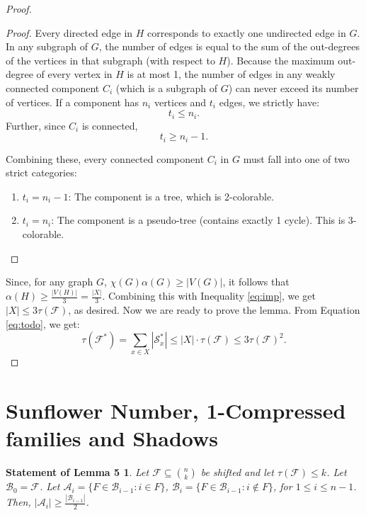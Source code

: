 \documentclass[runningheads,12pt,a4paper]{article}
\newtheorem*{statement5}{Statement of Lemma 5}
\begin{document}
\begin{proof}
\begin{proof}
			Every directed edge in $H$ corresponds to exactly one undirected edge in $G$. In any subgraph of $G$, the number of edges is equal to the sum of the out-degrees of the vertices in that subgraph (with respect to $H$). Because the maximum out-degree of every vertex in $H$ is at most 1, the number of edges in any weakly connected component $C_i$ (which is a subgraph of $G$) can never exceed its number of vertices. If a component has $n_i$ vertices and $t_i$ edges, we strictly have:$$t_i \le n_i.$$
			Further, since $C_i$ is connected, $$t_i \ge n_i-1.$$
			
			Combining these, every connected component $C_i$ in $G$ must fall into one of two strict categories:
			\begin{enumerate}
				\item $t_i = n_i - 1$: The component is a tree, which is 2-colorable. 
				\item $t_i = n_i$: The component is a pseudo-tree (contains exactly 1 cycle). This is $3$-colorable.
			\end{enumerate}
		\end{proof}
		
		Since, for any graph $G$, $\chi(G)\alpha(G) \geq |V(G)|$,
		it follows that $\alpha(H) \geq \frac{|V(H)|}{3}=\frac{|X|}{3}$. Combining this with Inequality \ref{eq:imp}, we get $|X| \leq 3\tau(\mathcal{F})$, as desired.
		Now we are ready to prove the lemma. 
		From Equation \ref{eq:todo}, we get:
		$$\tau(\mathcal{F}^*) = \sum_{x \in X}|\mathcal{S}^*_x| \leq |X| \cdot \tau(\mathcal{F}) \leq 3\tau(\mathcal{F})^2.$$
	\end{proof}
	
	

\section{Sunflower Number, 1-Compressed families and Shadows}\label{sec:ss}



\begin{statement5}
	Let $\mathcal{F} \subseteq \binom{n}{k}$ be shifted and  let $\tau(\mathcal{F}) \leq k$.
	Let $\mathcal{B}_0=\mathcal{F}$.
	Let $\mathcal{A}_i=\{F \in \mathcal{B}_{i-1} : i \in F\}$,
	$\mathcal{B}_i= \{F \in \mathcal{B}_{i-1} : i \notin F\}$, for $1 \leq i \leq n-1$. Then,
	$|\mathcal{A}_i| \geq \frac{|\mathcal{B}_{i-1}|}{2}$.
\end{statement5}
\end{document}
